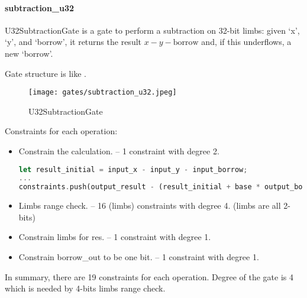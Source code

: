 \paragraph{subtraction\_u32}

U32SubtractionGate is a gate to perform a subtraction on 32-bit limbs: given `x', `y', and `borrow', it returns 
the result $x - y - \text{borrow}$ and, if this underflows, a new `borrow'.

Gate structure is like .

\begin{figure}[!ht]
    \centering
    \texttt{[image: gates/subtraction\_u32.jpeg]}
    \caption{U32SubtractionGate}
    \label{fig:subtraction-u32}
\end{figure}

Constraints for each operation:
\begin{itemize}
    \item Constrain the calculation. -- 1 constraint with degree 2.
    \begin{lstlisting}[language=rust]
let result_initial = input_x - input_y - input_borrow;
...
constraints.push(output_result - (result_initial + base * output_borrow));
    \end{lstlisting}
    \item Limbs range check. -- 16 (limbs) constraints with degree 4. (limbs are all 2-bits)
    \item Constrain limbs for res. -- 1 constraint with degree 1.
    \item Constrain borrow\_out to be one bit. -- 1 constraint with degree 1.
\end{itemize}

In summary, there are 19 constraints for each operation. Degree of the gate is 4 which is needed by 4-bits limbs range check.

